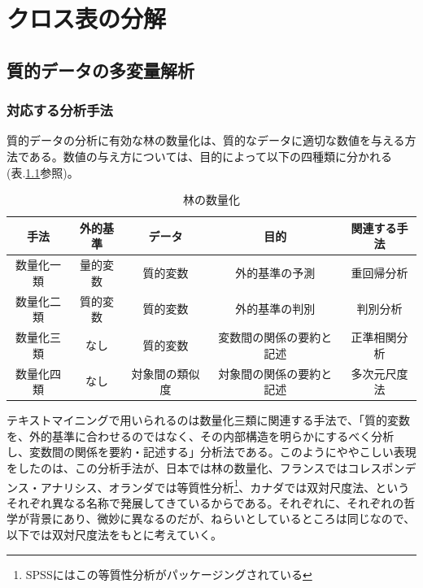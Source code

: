 \documentclass{ltjsbook}
\begin{document}
\chapter{クロス表の分解}
\label{H11_cross}

\section{質的データの多変量解析}
\subsection{対応する分析手法}
質的データの分析に有効な林の数量化は、質的なデータに適切な数値を与える方法である。数値の与え方については、目的によって以下の四種類に分かれる(表.\ref{分類}参照)。
\begin{table}[h]
    \caption{林の数量化}
    \begin{tabular}{c|c|c|c|c}
        手法    & 外的基準 & データ     & 目的           & 関連する手法 \\
        \hline
        数量化一類 & 量的変数 & 質的変数    & 外的基準の予測      & 重回帰分析  \\
        数量化二類 & 質的変数 & 質的変数    & 外的基準の判別      & 判別分析   \\
        数量化三類 & なし   & 質的変数    & 変数間の関係の要約と記述 & 正準相関分析 \\
        数量化四類 & なし   & 対象間の類似度 & 対象間の関係の要約と記述 & 多次元尺度法 \\
    \end{tabular}
    \label{分類}
\end{table}

テキストマイニングで用いられるのは数量化三類に関連する手法で、「質的変数を、外的基準に合わせるのではなく、その内部構造を明らかにするべく分析し、変数間の関係を要約・記述する」分析法である。このようにややこしい表現をしたのは、この分析手法が、日本では林の数量化、フランスではコレスポンデンス・アナリシス、オランダでは等質性分析\footnote{SPSSにはこの等質性分析がパッケージングされている}、カナダでは双対尺度法、というそれぞれ異なる名称で発展してきているからである。それぞれに、それぞれの哲学が背景にあり、微妙に異なるのだが、ねらいとしているところは同じなので、以下では双対尺度法をもとに考えていく。
\end{document}
